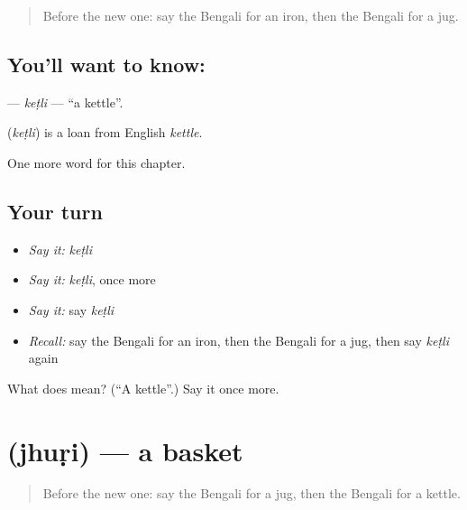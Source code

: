 \label{lesson:BN-C194-ketli}



\begin{quote}
Before the new one: say the Bengali for an iron, then the Bengali for a jug.
\end{quote}

\subsection*{You'll want to know: }
\textbf{} — \emph{keṭli} — \textquotedblleft{}a kettle\textquotedblright{}.

\begin{cousinweb}
\textbf{} (\emph{keṭli}) is a loan from English \emph{kettle}.
\end{cousinweb}

\begin{grammarlens}[title={What you've built}]
One more word for this chapter.
\end{grammarlens}

\subsection*{Your turn}
\begin{itemize}
\raggedright
  \item \emph{Say it:} \emph{keṭli}
  \item \emph{Say it:} \emph{keṭli}, once more
  \item \emph{Say it:} say \emph{keṭli}
  \item \emph{Recall:} say the Bengali for an iron, then the Bengali for a jug, then say \emph{keṭli} again
\end{itemize}

\begin{tcolorbox}[breakable,colback=teal!4,colframe=teal!35!black,title={Before you move on}]
What does  mean? (\textquotedblleft{}A kettle\textquotedblright{}.) Say it once more.
\end{tcolorbox}
\section[\texorpdfstring{\bn{ঝুড়ি} (jhuṛi)}{ঝুড়ি (jhuṛi)}]{ (jhuṛi) — a basket}

\label{lesson:BN-C194-jhuri}



\begin{quote}
Before the new one: say the Bengali for a jug, then the Bengali for a kettle.
\end{quote}

